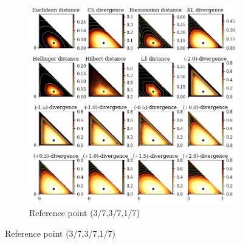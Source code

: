 \documentclass[graybox]{svmult}
\begin{document}
\begin{figure}
\centering
\begin{subfigure}{\textwidth}
\includegraphics[width=\textwidth]{categories1}
\caption{Reference point (3/7,3/7,1/7)}
\end{subfigure}
\end{figure}
\end{document}
